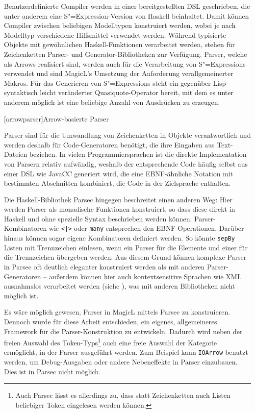 \documentclass[12pt, a4paper, bibgerm]{scrbook}
\newcommand\icode[1]{\lstinline?#1?}
\newcommand\lchapter{}
\newcommand{\sexp}{S"=Expression}
\newcommand{\sexps}{S"=Expressions}
\begin{document}
Benutzerdefinierte Compiler werden in einer bereitgestellten DSL
geschrieben, die unter anderem eine \sexp{}-Version von Haskell
beinhaltet. Damit können Compiler zwischen beliebigen Modelltypen
konstruiert werden, wobei je nach Modelltyp verschiedene Hilfsmittel
verwendet werden. Während typisierte Objekte mit gewöhnlichen
Haskell-Funktionen verarbeitet werden, stehen für Zeichenketten Parser-
und Generator-Bibliotheken zur Verfügung. Parser, welche als Arrows
realisiert sind, werden auch für die Verarbeitung von \sexps{}
verwendet und sind MagicL's Umsetzung der Anforderung verallgemeinerter
Makros. Für das Generieren von \sexps{} steht ein gegenüber Lisp
syntaktisch leicht veränderter Quasiquote-Operator bereit, mit dem es
unter anderem möglich ist eine beliebige Anzahl von Ausdrücken zu
erzeugen.

\lchapter[arrowparser]{Arrow-basierte Parser}

Parser sind für die Umwandlung von Zeichenketten in Objekte
verantwortlich und werden deshalb für Code-Generatoren benötigt, die
ihre Eingaben aus Text-Dateien beziehen. In vielen Programmiersprachen
ist die direkte Implementation von Parsern relativ aufwändig, weshalb
der entsprechende Code häufig selbst aus einer DSL wie JavaCC
generiert wird, die eine EBNF-ähnliche Notation mit bestimmten
Abschnitten kombiniert, die Code in der Zielsprache enthalten.

Die Haskell-Bibliothek Parsec \cite{Parsec} hingegen beschreitet einen
anderen Weg: Hier werden Parser als monadische Funktionen konstruiert,
so dass diese direkt in Haskell und ohne spezielle Syntax beschrieben
werden können. Parser-Kombinatoren wie \icode{<|>} oder \icode{many}
entsprechen den EBNF-Operationen. Darüber hinaus können sogar eigene
Kombinatoren definiert werden. So könnte \icode{sepBy}
Listen mit Trennzeichen einlesen, wenn ein Parser für die Elemente und
einer für die Trennzeichen übergeben werden. Aus diesem Grund können
komplexe Parser in Parsec oft deutlich eleganter konstruiert werden als
mit anderen Parser-Generatoren -- außerdem können hier auch
kontextsensitive Sprachen wie XML ausnahmslos verarbeitet werden (siehe
\cite[S. 3]{Parsec}), was mit anderen Bibliotheken nicht möglich ist.

Es wäre möglich gewesen, Parser in MagicL mittels Parsec zu
konstruieren. Dennoch wurde für diese Arbeit entschieden, ein eigenes,
allgemeineres Framework für die Parser-Konstruktion zu
entwickeln. Dadurch wird neben der freien Auswahl des
Token-Typs\footnote{Auch Parsec lässt es allerdings zu, dass statt
  Zeichenketten auch Listen beliebiger Token eingelesen werden können.}
auch eine freie Auswahl der Kategorie ermöglicht, in der Parser
ausgeführt werden. Zum Beispiel kann \icode{IOArrow} benutzt werden,
um Debug-Ausgaben oder andere Nebeneffekte in Parser einzubauen. Dies
ist in Parsec nicht möglich.
\end{document}
